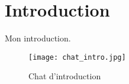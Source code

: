 \documentclass[../main.tex]{subfiles}
\begin{document}
\ifSubfilesClassLoaded{
}{}
\chapter{Introduction}
Mon introduction.
\begin{figure}[h]
    \centering
    \texttt{[image: chat\_intro.jpg]}
    \caption{Chat d'introduction}
    \label{fig:chat_intro}
\end{figure}
\ifSubfilesClassLoaded{%
    \printbibliography
}{}
\end{document}
